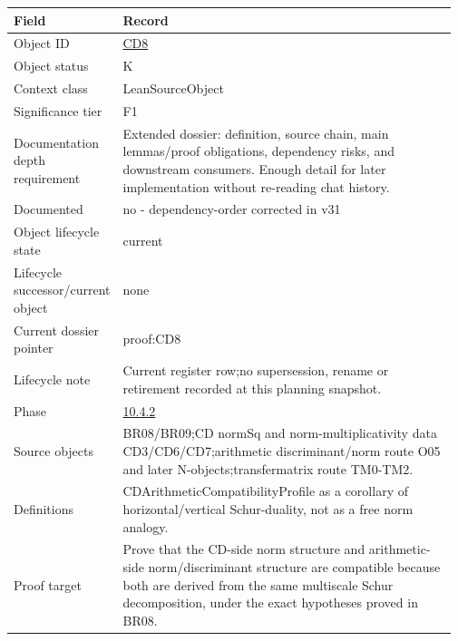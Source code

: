 \begin{longtable}{L{0.16\linewidth} L{0.81\linewidth}}
\hline
\textbf{Field} & \textbf{Record}\\
\hline
Object ID & \hyperlink{object-row-CD8}{CD8}\\
\hline\addlinespace[0.20em]
Object status & K\\
\hline\addlinespace[0.20em]
Context class & LeanSourceObject\\
\hline\addlinespace[0.20em]
Significance tier & F1\\
\hline\addlinespace[0.20em]
Documentation depth requirement & Extended dossier: definition, source chain, main lemmas/\allowbreak{}proof obligations, dependency risks, and downstream consumers. Enough detail for later implementation without re-reading chat history.\\
\hline\addlinespace[0.20em]
Documented & no - dependency-order corrected in v31\\
\hline\addlinespace[0.20em]
Object lifecycle state & current\\
\hline\addlinespace[0.20em]
Lifecycle successor/\allowbreak{}current object & none\\
\hline\addlinespace[0.20em]
Current dossier pointer & proof:CD8\\
\hline\addlinespace[0.20em]
Lifecycle note & Current register row;\newline no supersession, rename or retirement recorded at this planning snapshot.\\
\hline\addlinespace[0.20em]
Phase & \hyperlink{phase-row-10-4-2}{10.4.2}\\
\hline\addlinespace[0.20em]
Source objects & BR08/\allowbreak{}BR09;\newline CD normSq and norm-multiplicativity data CD3/\allowbreak{}CD6/\allowbreak{}CD7;\newline arithmetic discriminant/\allowbreak{}norm route O05 and later N-objects;\newline transfermatrix route TM0-TM2.\\
\hline\addlinespace[0.20em]
Definitions & CDArithmeticCompatibilityProfile as a corollary of horizontal/\allowbreak{}vertical Schur-duality, not as a free norm analogy.\\
\hline\addlinespace[0.20em]
Proof target & Prove that the CD-side norm structure and arithmetic-side norm/\allowbreak{}discriminant structure are compatible because both are derived from the same multiscale Schur decomposition, under the exact hypotheses proved in BR08.\\

\end{longtable}
